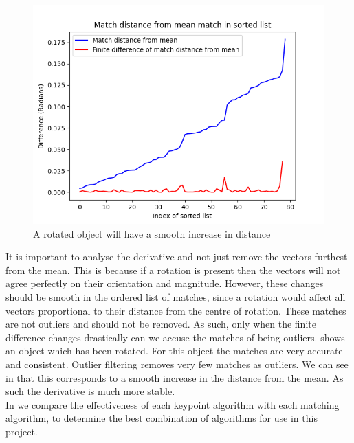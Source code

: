 \begin{figure}[H]
    \centering
    \includegraphics[width=\textwidth]{figures/good-matches.png}
    \caption{A rotated object will have a smooth increase in distance}
    \label{fig:good-matches}
\end{figure}

It is important to analyse the derivative and not just remove the vectors furthest from the mean. This is because if a rotation is present then the vectors will not agree perfectly on their orientation and magnitude. However, these changes should be smooth in the ordered list of matches, since a rotation would affect all vectors proportional to their distance from the centre of rotation. These matches are not outliers and should not be removed. As such, only when the finite difference changes drastically can we accuse the matches of being outliers.  shows an object which has been rotated. For this object the matches are very accurate and consistent. Outlier filtering removes very few matches as outliers. We can see in  that this corresponds to a smooth increase in the distance from the mean. As such the derivative is much more stable.\\

In  we compare the effectiveness of each keypoint algorithm with each matching algorithm, to determine the best combination of algorithms for use in this project.\\



